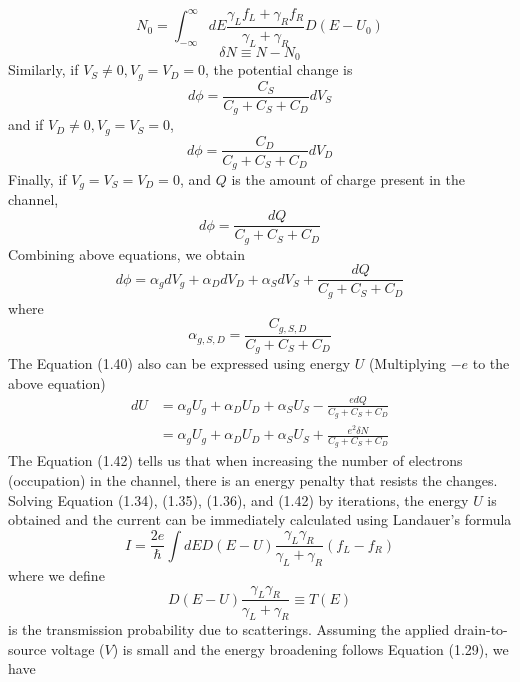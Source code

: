 \begin{equation}
    N_{0} = \int_{-\infty}^{\infty} dE \frac{\gamma_{L} f_{L} + \gamma_{R} f_{R}}{\gamma_{L}+\gamma_{R}}D\left(E-U_{0}\right)
\end{equation}
\begin{equation}
    \delta N \equiv N - N_{0}
\end{equation} Similarly, if $V_{S} \neq 0, V_{g} = V_{D} = 0$, the potential change is \begin{equation}
    d\phi = \frac{C_{S}}{C_{g}+C_{S}+C_{D}}dV_{S}
\end{equation} and if $V_{D} \neq 0, V_{g} = V_{S} = 0$, \begin{equation}
    d\phi = \frac{C_{D}}{C_{g}+C_{S}+C_{D}}dV_{D}
\end{equation} Finally, if $V_{g} = V_{S} = V_{D} = 0$, and $Q$ is the amount of charge present in the channel, 
\begin{equation}
    d\phi = \frac{dQ}{C_{g}+C_{S}+C_{D}}
\end{equation} Combining above equations, we obtain \begin{equation}
    d\phi = \alpha_{g} dV_{g} + \alpha_{D} dV_{D} + \alpha_{S} dV_{S} + \frac{dQ}{C_{g}+C_{S}+C_{D}}
\end{equation} where \begin{equation}
    \alpha_{g,S,D} = \frac{C_{g,S,D}}{C_{g}+C_{S}+C_{D}}
\end{equation} The Equation (1.40) also can be expressed using energy $U$ (Multiplying $-e$ to the above equation) 
\begin{align}
    dU& = \alpha_{g} U_{g} + \alpha_{D} U_{D} + \alpha_{S} U_{S} - \frac{edQ}{C_{g}+C_{S}+C_{D}}\nonumber\\
    & = \alpha_{g} U_{g} + \alpha_{D} U_{D} + \alpha_{S} U_{S} + \frac{e^{2}\delta N}{C_{g}+C_{S}+C_{D}}
\end{align} The Equation (1.42) tells us that when increasing the number of electrons (occupation) in the channel, there is an energy penalty that resists the changes. Solving Equation (1.34), (1.35), (1.36), and (1.42) by iterations, the energy $U$ is obtained and the current can be immediately calculated using Landauer's formula \begin{equation}
    I = \frac{2e}{\hbar}\int dE D\left(E-U\right) \frac{\gamma_{L}\gamma_{R}}{\gamma_{L}+\gamma_{R}} \left(f_{L}-f_{R}\right)
\end{equation} where we define 
\begin{equation}
    D\left(E-U\right) \frac{\gamma_{L}\gamma_{R}}{\gamma_{L}+\gamma_{R}} \equiv T\left(E\right)
\end{equation} is the transmission probability due to scatterings. Assuming the applied drain-to-source voltage ($V$) is small and the energy broadening follows Equation (1.29), we have 
